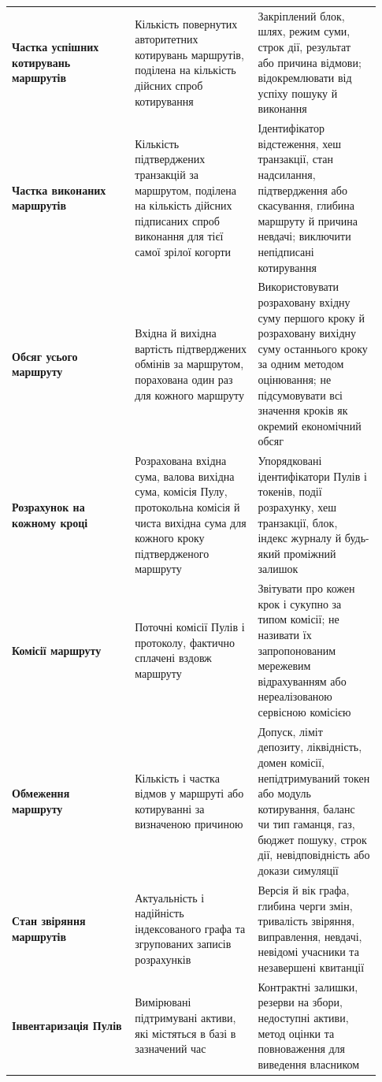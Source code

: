 \documentclass[11pt]{article}
\begin{document}
\begin{longtable}{P{0.31\linewidth} P{0.31\linewidth} P{0.31\linewidth}}
\textbf{Частка успішних котирувань маршрутів} & Кількість повернутих авторитетних котирувань маршрутів, поділена на кількість дійсних спроб котирування & Закріплений блок, шлях, режим суми, строк дії, результат або причина відмови; відокремлювати від успіху пошуку й виконання \\
\textbf{Частка виконаних маршрутів} & Кількість підтверджених транзакцій за маршрутом, поділена на кількість дійсних підписаних спроб виконання для тієї самої зрілої когорти & Ідентифікатор відстеження, хеш транзакції, стан надсилання, підтвердження або скасування, глибина маршруту й причина невдачі; виключити непідписані котирування \\
\textbf{Обсяг усього маршруту} & Вхідна й вихідна вартість підтверджених обмінів за маршрутом, порахована один раз для кожного маршруту & Використовувати розраховану вхідну суму першого кроку й розраховану вихідну суму останнього кроку за одним методом оцінювання; не підсумовувати всі значення кроків як окремий економічний обсяг \\
\textbf{Розрахунок на кожному кроці} & Розрахована вхідна сума, валова вихідна сума, комісія Пулу, протокольна комісія й чиста вихідна сума для кожного кроку підтвердженого маршруту & Упорядковані ідентифікатори Пулів і токенів, події розрахунку, хеш транзакції, блок, індекс журналу й будь-який проміжний залишок \\
\textbf{Комісії маршруту} & Поточні комісії Пулів і протоколу, фактично сплачені вздовж маршруту & Звітувати про кожен крок і сукупно за типом комісії; не називати їх запропонованим мережевим відрахуванням або нереалізованою сервісною комісією \\
\textbf{Обмеження маршруту} & Кількість і частка відмов у маршруті або котируванні за визначеною причиною & Допуск, ліміт депозиту, ліквідність, домен комісії, непідтримуваний токен або модуль котирування, баланс чи тип гаманця, газ, бюджет пошуку, строк дії, невідповідність або докази симуляції \\
\textbf{Стан звіряння маршрутів} & Актуальність і надійність індексованого графа та згрупованих записів розрахунків & Версія й вік графа, глибина черги змін, тривалість звіряння, виправлення, невдачі, невідомі учасники та незавершені квитанції \\
\textbf{Інвентаризація Пулів} & Вимірювані підтримувані активи, які містяться в базі в зазначений час & Контрактні залишки, резерви на збори, недоступні активи, метод оцінки та повноваження для виведення власником \\

\end{longtable}
\end{document}
